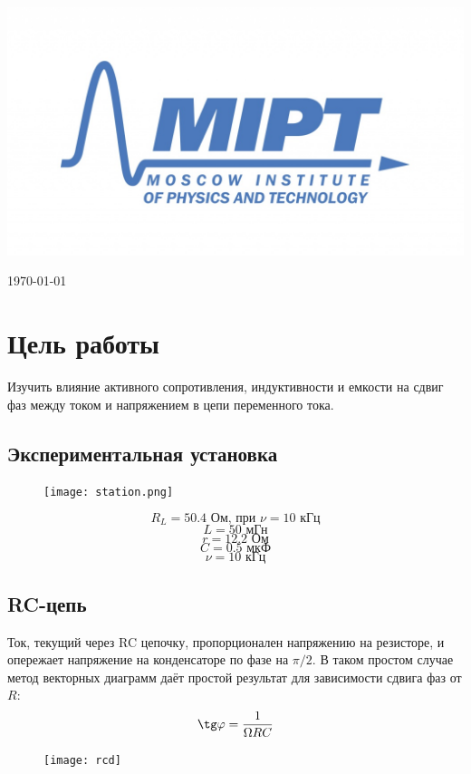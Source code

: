 \documentclass[a4paper, 12pt]{article}
\newenvironment{bottompar}{\par\vspace*{\fill}}{\clearpage}
\begin{document}
\begin{titlepage}
\begin{bottompar}
	\begin{center}
		\includegraphics[width = 80 mm]{logo.jpg}
	\end{center}
	{\large \today}

\end{bottompar}
\vfill %

\end{titlepage}

\section{Цель работы}
Изучить влияние активного сопротивления, индуктивности и емкости на сдвиг фаз между током и напряжением в цепи переменного тока.

\subsection*{Экспериментальная установка}


\begin{figure}
	\texttt{[image: station.png]}
\end{figure}
$$R_L=50.4 \text{ Ом, при $\nu = 10 \text{ кГц}$}$$
$$L=50 \text{ мГн}$$
$$r=12.2 \text{ Ом}$$
$$C=0.5 \text{ мкФ}$$
$$\nu = 10 \text{ кГц}$$

\subsection*{RC-цепь}


Ток, текущий через RC цепочку, пропорционален напряжению на резисторе, и опережает напряжение на конденсаторе по фазе на $\pi/2$. В таком простом случае метод векторных диаграмм даёт простой результат для зависимости сдвига фаз от $R$:
$$\tg \varphi = \frac{1}{\Omega R C}$$
\begin {figure}[H]
\begin{center}
\texttt{[image: rcd]}
\end{center}
\end {figure}
\end{document}
